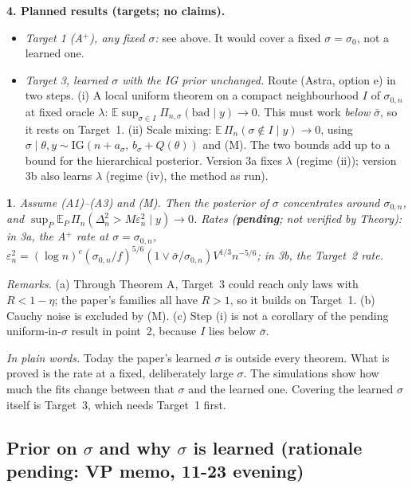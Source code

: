 \documentclass[11pt]{article}
\newcommand{\E}{\mathbb{E}}
\newcommand{\sbar}{\bar\sigma}
\newcommand{\Post}{\Pi_n}
\theoremstyle{plain}
\newcommand{\mythmname}{}
\newtheorem*{namedx}{\mythmname}
\newenvironment{named}[1]{\renewcommand{\mythmname}{#1}\begin{namedx}}{\end{namedx}}
\theoremstyle{definition}
\theoremstyle{remark}
\newcommand{\plainly}[1]{\par\smallskip\noindent\textit{In plain words.} #1\par\smallskip}
\begin{document}
\medskip\noindent\textbf{4. Planned results (targets; no claims).}
\begin{itemize}
\item \emph{Target 1 (A$^+$), any fixed $\sigma$:} see above. It would cover a fixed $\sigma=\sigma_0$, not a learned one.
\item \emph{Target 3, learned $\sigma$ with the IG prior unchanged.} Route (Astra, option e) in two steps. (i) A local uniform theorem on a compact neighbourhood $I$ of $\sigma_{0,n}$ at fixed oracle $\lambda$: $\E\sup_{\sigma\in I}\Pi_{n,\sigma}(\text{bad}\mid y)\to0$. This must work \emph{below} $\sbar$, so it rests on Target~1. (ii) Scale mixing: $\E\,\Post(\sigma\notin I\mid y)\to0$, using $\sigma\mid\theta,y\sim\mathrm{IG}(n+a_\sigma,\,b_\sigma+Q(\theta))$ and (M). The two bounds add up to a bound for the hierarchical posterior. Version 3a fixes $\lambda$ (regime (ii)); version 3b also learns $\lambda$ (regime (iv), the method as run).
\end{itemize}

\begin{named}{Target 3 (proposed)}
Assume (A1)--(A3) and (M). Then the posterior of $\sigma$ concentrates around $\sigma_{0,n}$, and $\sup_P\E_P\,\Post(\Delta_n^2>M\varepsilon_n^2\mid y)\to0$. Rates (\textcolor{progress}{\textbf{pending}}; not verified by Theory): in 3a, the A$^+$ rate at $\sigma=\sigma_{0,n}$, $\varepsilon_n^2=(\log n)^c(\sigma_{0,n}/f)^{5/6}(1\vee\sbar/\sigma_{0,n})V^{1/3}n^{-5/6}$; in 3b, the Target~2 rate.
\end{named}

\noindent\textit{Remarks.} (a) Through Theorem A, Target~3 could reach only laws with $R<1-\eta$; the paper's families all have $R>1$, so it builds on Target~1. (b) Cauchy noise is excluded by (M). (c) Step (i) is not a corollary of the pending uniform-in-$\sigma$ result in point~2, because $I$ lies below $\sbar$.

\plainly{Today the paper's learned $\sigma$ is outside every theorem. What is proved is the rate at a fixed, deliberately large $\sigma$. The simulations show how much the fits change between that $\sigma$ and the learned one. Covering the learned $\sigma$ itself is Target~3, which needs Target~1 first.}

\subsection{\texorpdfstring{Prior on $\sigma$ and why $\sigma$ is learned (rationale pending: VP memo, 11-23 evening)}{Prior on sigma and why sigma is learned (rationale pending: VP memo, 11-23 evening)}}
\label{sec:sigmaprior}
\end{document}
